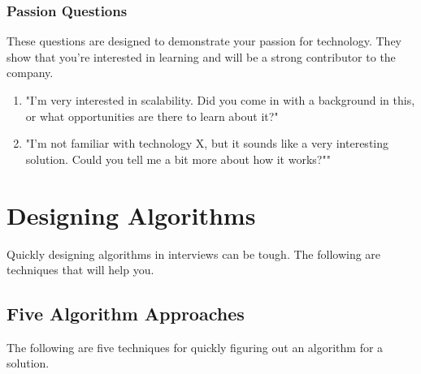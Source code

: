 \documentclass{article}
\begin{document}
		\subsubsection{Passion Questions}
			These questions are designed to demonstrate your passion for technology. They show that you're interested in learning and will be a strong contributor to the company.
			\begin{enumerate}
				\item "I'm very interested in scalability. Did you come in with a background in this, or what opportunities are there to learn about it?"
				\item "I'm not familiar with technology X, but it sounds like a very interesting solution. Could you tell me a bit more about how it works?""
			\end{enumerate}


\clearpage
\section{Designing Algorithms}
	Quickly designing algorithms in interviews can be tough. The following are techniques that will help you.

	\subsection{Five Algorithm Approaches}
		The following are five techniques for quickly figuring out an algorithm for a solution.
\end{document}
